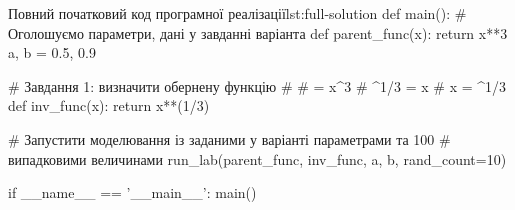 \documentclass[
	a4paper,
	oneside,
	BCOR = 10mm,
	DIV = 12,
	12pt,
	headings = normal,
]{scrartcl}
\begin{document}
\begin{listingpython}[toprule = 0pt, bottomrule = 0pt]{Повний початковий код програмної реалізації}{lst:full-solution}
def main():
    # Оголошуємо параметри, дані у завданні варіанта
    def parent_func(x): return x**3
    a, b = 0.5, 0.9

    # Завдання 1: визначити обернену функцію
    #
    # \xi = x^3
    # \xi^{1/3} = x
    # x = \xi^{1/3}
    def inv_func(x): return x**(1/3)

    # Запустити моделювання із заданими у варіанті параметрами та 100
    # випадковими величинами
    run_lab(parent_func, inv_func, a, b, rand_count=10)


if __name__ == '__main__':
    main()
			\end{listingpython}
\end{document}
